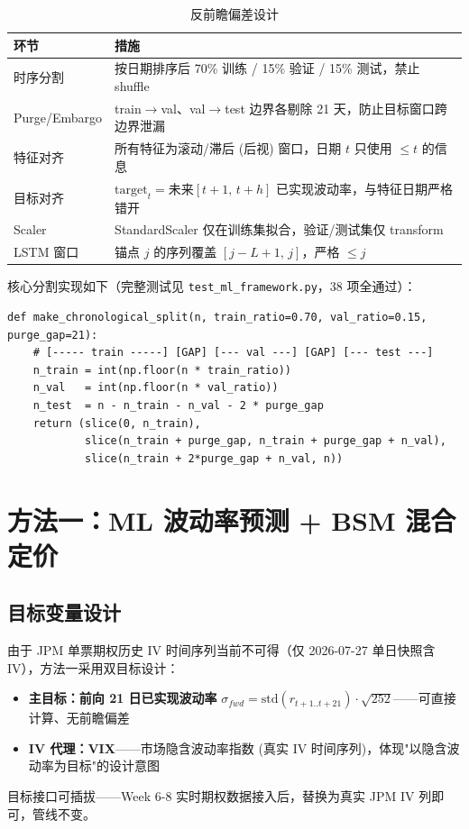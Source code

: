\documentclass[a4paper,11pt]{article}
\begin{document}
\begin{table}[H]
\centering
\caption{反前瞻偏差设计}
\label{tab:leakage}
\begin{tabular}{p{3.2cm}p{11cm}}
\toprule
\textbf{环节} & \textbf{措施} \\
\midrule
时序分割 & 按日期排序后 70\% 训练 / 15\% 验证 / 15\% 测试，禁止 shuffle \\
Purge/Embargo & train$\to$val、val$\to$test 边界各剔除 21 天，防止目标窗口跨边界泄漏 \\
特征对齐 & 所有特征为滚动/滞后 (后视) 窗口，日期 $t$ 只使用 $\leq t$ 的信息 \\
目标对齐 & $\text{target}_t = \text{未来}[t{+}1,\, t{+}h]$ 已实现波动率，与特征日期严格错开 \\
Scaler & StandardScaler 仅在训练集拟合，验证/测试集仅 transform \\
LSTM 窗口 & 锚点 $j$ 的序列覆盖 $[j{-}L{+}1,\, j]$，严格 $\leq j$ \\
\bottomrule
\end{tabular}
\end{table}

核心分割实现如下（完整测试见 \texttt{test\_ml\_framework.py}，38 项全通过）：

\begin{lstlisting}[caption={时间序列分割 (无前瞻偏差)},label={lst:split}]
def make_chronological_split(n, train_ratio=0.70, val_ratio=0.15, purge_gap=21):
    # [----- train -----] [GAP] [--- val ---] [GAP] [--- test ---]
    n_train = int(np.floor(n * train_ratio))
    n_val   = int(np.floor(n * val_ratio))
    n_test  = n - n_train - n_val - 2 * purge_gap
    return (slice(0, n_train),
            slice(n_train + purge_gap, n_train + purge_gap + n_val),
            slice(n_train + 2*purge_gap + n_val, n))
\end{lstlisting}

\section{方法一：ML 波动率预测 + BSM 混合定价}

\subsection{目标变量设计}

由于 JPM 单票期权历史 IV 时间序列当前不可得（仅 2026-07-27 单日快照含 IV），方法一采用双目标设计：
\begin{itemize}
    \item \textbf{主目标：前向 21 日已实现波动率} $\sigma_{fwd} = \mathrm{std}(r_{t{+}1..t{+}21})\cdot\sqrt{252}$——可直接计算、无前瞻偏差
    \item \textbf{IV 代理：VIX}——市场隐含波动率指数 (真实 IV 时间序列)，体现"以隐含波动率为目标"的设计意图
\end{itemize}
目标接口可插拔——Week 6-8 实时期权数据接入后，替换为真实 JPM IV 列即可，管线不变。
\end{document}
